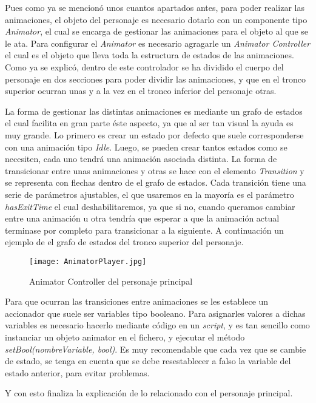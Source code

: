 Pues como ya se mencionó unos cuantos apartados antes, para poder realizar las animaciones, el objeto del personaje es necesario dotarlo con un componente tipo \textit{Animator}, el cual se encarga de gestionar las animaciones para el objeto al que se le ata. Para configurar el \textit{Animator} es necesario agragarle un \textit{Animator Controller} el cual es el objeto que lleva toda la estructura de estados de las animaciones. Como ya se explicó, dentro de este controlador se ha dividido el cuerpo del personaje en dos secciones para poder dividir las animaciones, y que en el tronco superior ocurran unas y a la vez en el tronco inferior del personaje otras.

La forma de gestionar las distintas animaciones es mediante un grafo de estados el cual facilita en gran parte éste aspecto, ya que al ser tan visual la ayuda es muy grande. Lo primero es crear un estado por defecto que suele corresponderse con una animación tipo \textit{Idle}. Luego, se pueden crear tantos estados como se necesiten, cada uno tendrá una animación asociada distinta. La forma de transicionar entre unas animaciones y otras se hace con el elemento \textit{Transition} y se representa con flechas dentro de el grafo de estados. Cada transición tiene una serie de parámetros ajustables, el que usaremos en la mayoría es el parámetro \textit{hasExitTime} el cual deshabilitaremos, ya que si no, cuando queramos cambiar entre una animación u otra tendría que esperar a que la animación actual terminase por completo para transicionar a la siguiente. A continuación un ejemplo de el grafo de estados del tronco superior del personaje.

\begin{figure}[H]
    \centering
    \texttt{[image: AnimatorPlayer.jpg]}
    \caption{Animator Controller del personaje principal}
\end{figure}

Para que ocurran las transiciones entre animaciones se les establece un accionador que suele ser variables tipo booleano. Para asignarles valores a dichas variables es necesario hacerlo mediante código en un \textit{script}, y es tan sencillo como instanciar un objeto animator en el fichero, y ejecutar el método \textit{setBool(nombreVariable, bool)}. Es muy recomendable que cada vez que se cambie de estado, se tenga en cuenta que se debe resestablecer a falso la variable del estado anterior, para evitar problemas.

Y con esto finaliza la explicación de lo relacionado con el personaje principal. 


